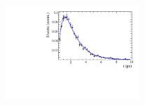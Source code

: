 

\begin{figure}[h]
	\centering
		\includegraphics[width=0.45\textwidth, height = !]{figs/timeFit/signal/h_t.pdf} 
		\caption{} 		
\end{figure}	



